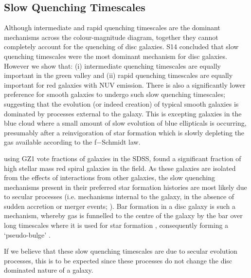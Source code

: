 \subsection{Slow Quenching Timescales}\label{slow}
Although intermediate and rapid quenching timescales are the dominant mechanisms across the colour-magnitude diagram, together they cannot completely account for the quenching of disc galaxies. S14 concluded that slow quenching timescales were the most dominant mechanism for disc galaxies. However we show that: (i) intermediate quenching timescales are equally important in the green valley and (ii) rapid quenching timescales are equally important for red galaxies with NUV emission. There is also a significantly lower preference for smooth galaxies to undergo such slow quenching timescales; suggesting that the evolution (or indeed creation) of typical smooth galaxies is dominated by processes external to the galaxy. This is excepting galaxies in the blue cloud where a small amount of slow evolution of blue ellipticals is occurring, presumably after a reinvigoration of star formation which is slowly depleting the gas available according to the f$-$Schmidt law.

\citet{Bamford09} using GZ1 vote fractions of galaxies in the SDSS, found a significant fraction of high stellar mass red spiral galaxies in the field. As these galaxies are isolated from the effects of interactions from other galaxies, the slow quenching mechanisms present in their preferred star formation histories are most likely due to secular processes (i.e. mechanisms internal to the galaxy, in the absence of sudden accretion or merger events; \citealt{kormendy04, Sheth12}). Bar formation in a disc galaxy is such a mechanism, whereby gas is funnelled to the centre of the galaxy by the bar over long timescales where it is used for star formation \citep{masters12a, saintonge12, Cheung13}, consequently forming a `pseudo-bulge' \citep{Kormendy10, Simmons13}.

If we believe that these slow quenching timescales are due to secular evolution processes, this is to be expected since these processes do not change the disc dominated nature of a galaxy. 

